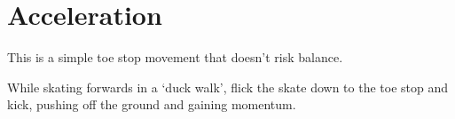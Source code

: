 \section{Acceleration}
\label{sec:toe_stop/acceleration}

This is a simple toe stop movement that doesn't risk balance. 

While skating forwards in a `duck walk', flick the skate down to the toe stop and kick, pushing off the ground and gaining momentum.   
